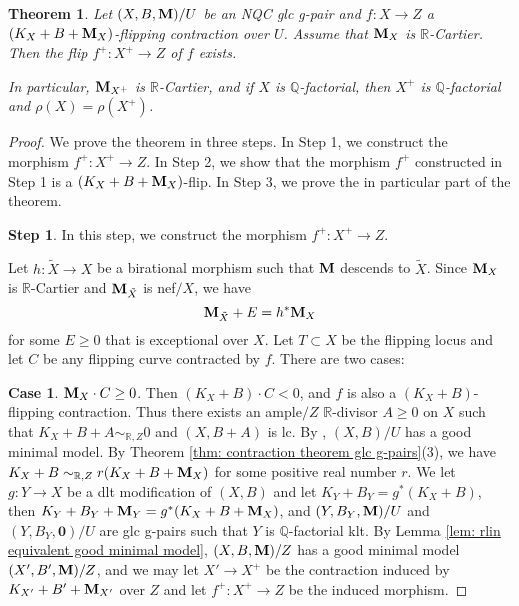 \documentclass[11pt]{amsart}
\numberwithin{equation}{section}
\newcommand{\Mm}{{\bf{M}}}
\newcommand{\Qq}{\mathbb{Q}}
\newcommand{\Rr}{\mathbb{R}}
\newtheorem{thm}{Theorem}[section]
\theoremstyle{definition}
\theoremstyle{definition}
\theoremstyle{definition}
\begin{document}
\begin{thm}\label{thm: existence glc flip with m r cartier}
Let $(X,B,\Mm)/U$ be an NQC glc g-pair and $f: X\rightarrow Z$ a $(K_X+B+\Mm_X)$-flipping contraction over $U$. Assume that $\Mm_X$ is $\Rr$-Cartier. Then the flip $f^+: X^+\rightarrow Z$ of $f$ exists. 

In particular, $\Mm_{X^+}$ is $\Rr$-Cartier, and if $X$ is $\Qq$-factorial, then $X^+$ is $\Qq$-factorial and $\rho(X)=\rho(X^+)$.
\end{thm}
\begin{proof}
We prove the theorem in three steps. In Step 1, we construct the morphism $f^+: X^+\rightarrow Z$. In Step 2, we show that the morphism $f^+$ constructed in Step 1 is a $(K_X+B+\Mm_X)$-flip. In Step 3, we prove the in particular part of the theorem.

\medskip

\noindent\textbf{Step 1}. In this step,  we construct the morphism $f^+: X^+\rightarrow Z$. 

Let $h: \tilde X\rightarrow X$ be a birational morphism such that $\Mm$ descends to $\tilde X$. Since $\Mm_X$ is $\Rr$-Cartier and $\Mm_{\tilde X}$ is nef$/X$, we have
$$\Mm_{\tilde X}+E=h^*\Mm_X$$
for some $E\geq 0$ that is exceptional over $X$. Let $T\subset X$ be the flipping locus and let $C$ be any flipping curve contracted by $f$. There are two cases:
\medskip

\noindent\textbf{Case 1}. $\Mm_X\cdot C\geq 0$. Then $(K_X+B)\cdot C<0$, and $f$ is also a $(K_X+B)$-flipping contraction. Thus there exists an ample$/Z$ $\Rr$-divisor $A\geq 0$ on $X$ such that $K_X+B+A\sim_{\Rr,Z}0$ and $(X,B+A)$ is lc. By \cite[Theorem 1.1]{Has19}, $(X,B)/U$ has a good minimal model. By Theorem \ref{thm: contraction theorem glc g-pairs}(3), we have $K_X+B\sim_{\Rr,Z}r(K_X+B+\Mm_X)$ for some positive real number $r$. We let $g: Y\rightarrow X$ be a dlt modification of $(X,B)$ and let $K_Y+B_Y=g^*(K_X+B)$, then $K_Y+B_Y+\Mm_Y=g^*(K_X+B+\Mm_X)$, and $(Y,B_Y,\Mm)/U$ and $(Y,B_Y,\mathbf{0})/U$ are glc g-pairs such that $Y$ is $\Qq$-factorial klt. By Lemma \ref{lem: rlin equivalent good minimal model}, $(X,B,\Mm)/Z$ has a good minimal model $(X',B',\Mm)/Z$, and we may let $X'\rightarrow X^+$ be the contraction induced by $K_{X'}+B'+\Mm_{X'}$ over $Z$ and let $f^+: X^+\rightarrow Z$ be the induced morphism.

\medskip


\end{proof}
\end{document}
